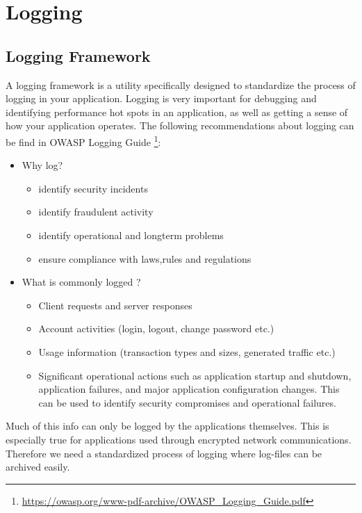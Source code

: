 \chapter{Logging}


\section{Logging Framework}

A logging framework is a utility specifically designed to standardize the process of logging in your application.  Logging is very important for debugging and identifying performance hot spots in an application, as well as getting a sense of how your application operates.  The following recommendations about logging can be find in OWASP Logging Guide \footnote{\url{https://owasp.org/www-pdf-archive/OWASP_Logging_Guide.pdf}}:

\begin{itemize}
\item Why log?
\begin{itemize}
\item identify security incidents
\item identify fraudulent activity
\item identify operational and longterm problems
\item ensure compliance with laws,rules and regulations
\end{itemize}
\item What is commonly logged ?
\begin{itemize}
\item Client requests and server responses
\item Account activities (login, logout, change password etc.)
\item Usage information (transaction types and sizes, generated traffic etc.)
\item Significant operational actions such as application startup and shutdown, application failures, and major application configuration changes. This can be used to identify security compromises and operational failures.
\end{itemize}
\end{itemize}

Much of this info can only be logged by the applications themselves. This is especially true for applications used through encrypted network communications. Therefore we need a standardized process of logging where log-files can be archived easily.

